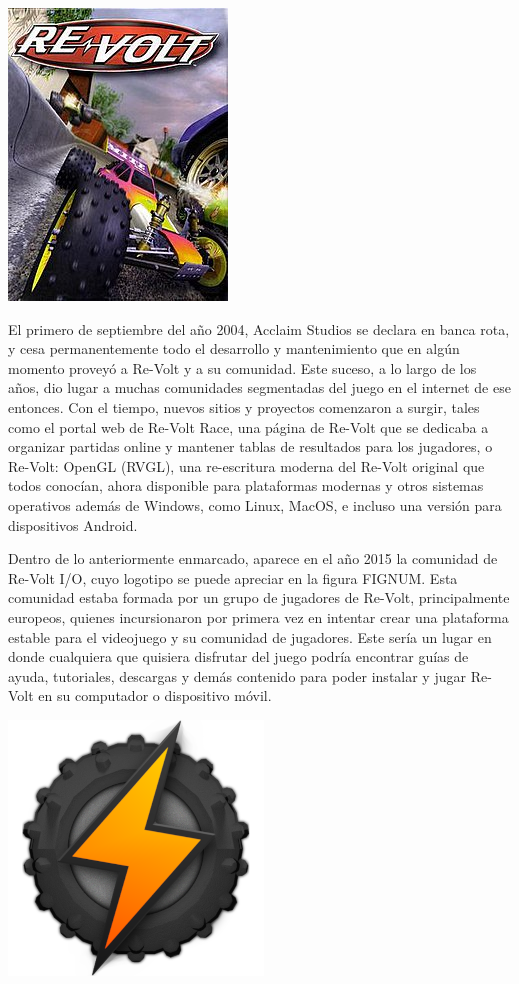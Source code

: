 \includegraphics{img/re-volt.jpg}

El primero de septiembre del año 2004, Acclaim Studios se declara en banca rota, y cesa permanentemente todo el desarrollo y mantenimiento que en algún momento proveyó a Re-Volt y a su comunidad. Este suceso, a lo largo de los años, dio lugar a muchas comunidades segmentadas del juego en el internet de ese entonces. Con el tiempo, nuevos sitios y proyectos comenzaron a surgir, tales como el portal web de Re-Volt Race, una página de Re-Volt que se dedicaba a organizar partidas online y mantener tablas de resultados para los jugadores, o Re-Volt: OpenGL (RVGL), una re-escritura moderna del Re-Volt original que todos conocían, ahora disponible para plataformas modernas y otros sistemas operativos además de Windows, como Linux, MacOS, e incluso una versión para dispositivos Android.

Dentro de lo anteriormente enmarcado, aparece en el año 2015 la comunidad de Re-Volt I/O, cuyo logotipo se puede apreciar en la figura FIGNUM. Esta comunidad estaba formada por un grupo de jugadores de Re-Volt, principalmente europeos, quienes incursionaron por primera vez en intentar crear una plataforma estable para el videojuego y su comunidad de jugadores. Este sería un lugar en donde cualquiera que quisiera disfrutar del juego podría encontrar guías de ayuda, tutoriales, descargas y demás contenido para poder instalar y jugar Re-Volt en su computador o dispositivo móvil.

\includegraphics{img/io.png}

